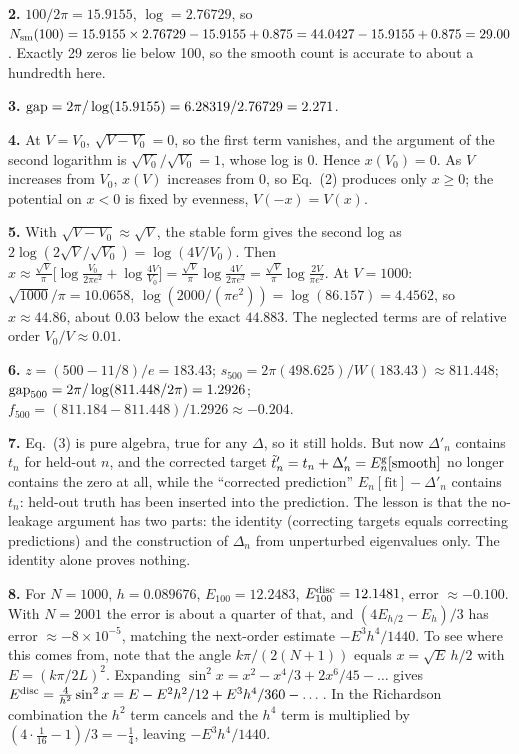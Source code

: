 \textbf{2.} $100/2\pi=15.9155$, $\log=2.76729$, so $N_{\mathrm{sm}}(100)=15.9155\times2.76729-15.9155+0.875=44.0427-15.9155+0.875=29.00$. Exactly 29 zeros lie below 100, so the smooth count is accurate to about a hundredth here.

\textbf{3.} $\mathrm{gap}=2\pi/\log(15.9155)=6.28319/2.76729=2.271$.

\textbf{4.} At $V=V_0$, $\sqrt{V-V_0}=0$, so the first term vanishes, and the argument of the second logarithm is $\sqrt{V_0}/\sqrt{V_0}=1$, whose log is 0. Hence $x(V_0)=0$. As $V$ increases from $V_0$, $x(V)$ increases from 0, so Eq.~(2) produces only $x\ge0$; the potential on $x<0$ is fixed by evenness, $V(-x)=V(x)$.

\textbf{5.} With $\sqrt{V-V_0}\approx\sqrt V$, the stable form gives the second log as $2\log(2\sqrt V/\sqrt{V_0})=\log(4V/V_0)$. Then $x\approx\frac{\sqrt V}{\pi}\bigl[\log\frac{V_0}{2\pi e^2}+\log\frac{4V}{V_0}\bigr]=\frac{\sqrt V}{\pi}\log\frac{4V}{2\pi e^2}=\frac{\sqrt V}{\pi}\log\frac{2V}{\pi e^2}$. At $V=1000$: $\sqrt{1000}/\pi=10.0658$, $\log(2000/(\pi e^2))=\log(86.157)=4.4562$, so $x\approx44.86$, about $0.03$ below the exact $44.883$. The neglected terms are of relative order $V_0/V\approx0.01$.

\textbf{6.} $z=(500-11/8)/e=183.43$; $s_{500}=2\pi(498.625)/W(183.43)\approx811.448$; $\mathrm{gap}_{500}=2\pi/\log(811.448/2\pi)=1.2926$; $f_{500}=(811.184-811.448)/1.2926\approx-0.204$.

\textbf{7.} Eq.~(3) is pure algebra, true for any $\Delta$, so it still holds. But now $\Delta'_n$ contains $t_n$ for held-out $n$, and the corrected target $\tilde t'_n=t_n+\Delta'_n=E^{\rm g}_n[\text{smooth}]$ no longer contains the zero at all, while the ``corrected prediction'' $E_n[\text{fit}]-\Delta'_n$ contains $t_n$: held-out truth has been inserted into the prediction. The lesson is that the no-leakage argument has two parts: the identity (correcting targets equals correcting predictions) and the construction of $\Delta_n$ from unperturbed eigenvalues only. The identity alone proves nothing.

\textbf{8.} For $N=1000$, $h=0.089676$, $E_{100}=12.2483$, $E^{\rm disc}_{100}=12.1481$, error $\approx-0.100$. With $N=2001$ the error is about a quarter of that, and $(4E_{h/2}-E_h)/3$ has error $\approx-8\times10^{-5}$, matching the next-order estimate $-E^3h^4/1440$. To see where this comes from, note that the angle $k\pi/(2(N+1))$ equals $x=\sqrt{E}\,h/2$ with $E=(k\pi/2L)^2$. Expanding $\sin^2x=x^2-x^4/3+2x^6/45-\dots$ gives $E^{\rm disc}=\frac4{h^2}\sin^2x=E-E^2h^2/12+E^3h^4/360-\dots$. In the Richardson combination the $h^2$ term cancels and the $h^4$ term is multiplied by $(4\cdot\tfrac1{16}-1)/3=-\tfrac14$, leaving $-E^3h^4/1440$.

